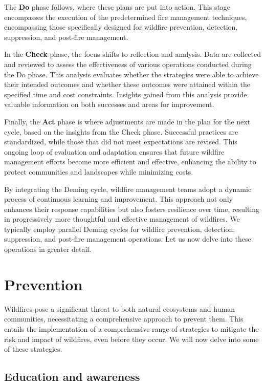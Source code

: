 \documentclass[
  12 pt,
]{Nemilov}
\begin{document}
The \textbf{Do} phase follows, where these plans are put into action. This stage encompasses the execution of the predetermined fire management techniques, encompassing those specifically designed for wildfire prevention, detection, suppression, and post-fire management.

In the \textbf{Check} phase, the focus shifts to reflection and analysis. Data are collected and reviewed to assess the effectiveness of various operations conducted during the Do phase. This analysis evaluates whether the strategies were able to achieve their intended outcomes and whether these outcomes were attained within the specified time and cost constraints. Insights gained from this analysis provide valuable information on both successes and areas for improvement.

Finally, the \textbf{Act} phase is where adjustments are made in the plan for the next cycle, based on the insights from the Check phase. Successful practices are standardized, while those that did not meet expectations are revised. This ongoing loop of evaluation and adaptation ensures that future wildfire management efforts become more efficient and effective, enhancing the ability to protect communities and landscapes while minimizing costs.

By integrating the Deming cycle, wildfire management teams adopt a dynamic process of continuous learning and improvement. This approach not only enhances their response capabilities but also fosters resilience over time, resulting in progressively more thoughtful and effective management of wildfires. We typically employ parallel Deming cycles for wildfire prevention, detection, suppression, and post-fire management operations. Let us now delve into these operations in greater detail.

\section{Prevention}\label{prevention}

Wildfires pose a significant threat to both natural ecosystems and human communities, necessitating a comprehensive approach to prevent them. This entails the implementation of a comprehensive range of strategies to mitigate the risk and impact of wildfires, even before they occur. We will now delve into some of these strategies.

\subsection{Education and awareness}\label{education-and-awareness}
\end{document}
